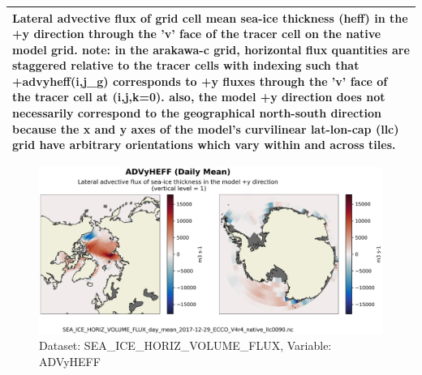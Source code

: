 \begin{longtable}{|m{}|m{}|m{}|m{}|}
\multicolumn{4}{|p{1\textwidth}|}{\footnotesize{{Lateral advective flux of grid cell mean sea-ice thickness (heff) in the +y direction through the 'v' face of the tracer cell on the native model grid. note: in the arakawa-c grid, horizontal flux quantities are staggered relative to the tracer cells with indexing such that +advyheff(i,j\_g) corresponds to +y fluxes through the 'v' face of the tracer cell at (i,j,k=0). also, the model +y direction does not necessarily correspond to the geographical north-south direction because the x and y axes of the model's curvilinear lat-lon-cap (llc) grid have arbitrary orientations which vary within and across tiles.}}} \\ \hline
\end{longtable}

\begin{figure}[H]
\centering
\includegraphics[scale=0.55]{../images/plots/v4r4/native_plots/Sea-Ice_and_Snow_Horizontal_Volume_Fluxes/ADVyHEFF.png}
\caption{Dataset: SEA\_ICE\_HORIZ\_VOLUME\_FLUX, Variable: ADVyHEFF}
\label{tab:table-SEA_ICE_HORIZ_VOLUME_FLUX_ADVyHEFF-Plot}
\end{figure}
\newpage
\pagebreak
